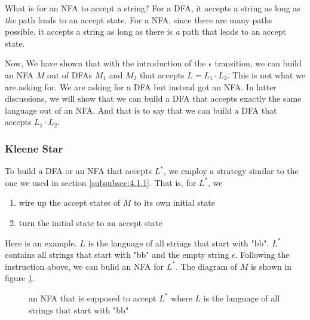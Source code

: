 \documentclass[11pt]{article}
\begin{document}
What is for an NFA to accept a string? For a DFA, it accepts a string
as long as \emph{the} path leads to an accept state. For a NFA, since
there are many paths possible, it accepts a string as long as there is
\emph{a} path that leads to an accept state.

Now, We have shown that with the introduction of the $\epsilon$
transition, we can build an NFA $M$ out of DFAs $M_1$ and $M_2$
that accepts $L = L_1 \cdot L_2$. This is not what we are asking
for. We are asking for a DFA but instead got an NFA. In latter
discussions, we will show that we can build a DFA that accepts
exactly the same language out of an NFA. And that is to say
that we can build a DFA that accepts $L_1 \cdot L_2$.

\subsubsection{Kleene Star}

To build a DFA or an NFA that accepts $L^\ast$, we employ a strategy
similar to the one we used in section \ref{subsubsec:4.1.1}. That is,
for $L^\ast$, we

\begin{enumerate}
\item wire up the accept states of $M$ to its own initial state
\item turn the initial state to an accept state
\end{enumerate}

Here is an example. $L$ is the language of all strings that start with "bb".
$L^\ast$ contains all strings that start with "bb" and the empty string $\epsilon$.
Following the instruction above, we can bulid an NFA for $L^\ast$. The diagram
of $M$ is shown in figure \ref{fig:fig8}.

\begin{figure}[ht]
    \centering
    \caption{an NFA that is supposed to accept $L^\ast$ where $L$ is the language
    of all strings that start with "bb"}
    \label{fig:fig8}
\end{figure}
\end{document}
